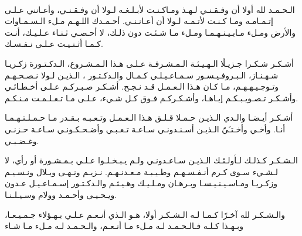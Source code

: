 \ \vfill{}
\begin{center}
    {
        \Large\bfseries
    }
\end{center}

\begin{RLtext}
    الـحـمـد لله أولا أن وفـقـنـي لـهـذ ومـاكـنـت لأبـلـغـه لـولا أن وفـقـنـي،
    وأعـانني عـلـى إتـمـامـه ومـا كـنـت لأتـمـه لـولا أن أعـانـنـي.
    أحـمـدك اللـهـم مـلء الـسـمـاوات والأرض ومـلء مـابـيـنـهـمـا ومـلء مـا شـئـت دون ذلـك،
    لا أحـصـي ثـنـاء عـلـيـك، أنـت كـمـا أثـنـيـت عـلـى نـفـسـك.
    
    أشـكـر شـكـرا جـزيـلًا الـهـيـئـة الـمـشـرفـة عـلـى هـذا الـمـشـروع،
    الـدكـتـورة زكـريـا شـهـنـاز، الـبـروفـيـسـور سـمـاعـيـلـي كـمـال والـدكـتـور ،
    الـذيـن لـولا نـصـحـهـم وتـوجـيـهـهـم، مـا كـان هـذا الـعـمـل قـد نـجـح.
    أشـكـر صـبـركـم عـلـى أخـطـائـي وأشـكـر تـصـويـبـكـم إيـاهـا،
    وأشـكـركـم فـوق كـل شـيء، عـلـى مـا تـعـلـمـت مـنـكـم.
    
    أشـكـر أيـضـا والـدي الـذيـن حـمـلا قـلـق هـذا الـعـمـل وتـعـبـه بـقـدر مـا حـمـلـتـهـمـا أنـا.
    وأخـي وأخـتـَيّ الـذيـن أسـنـدونـي سـاعـة تـعـبـي وأضـحـكـونـي سـاعـة حـزنـي وغـضـبـي.
    
    الـشـكـر كـذلـك لـأولـئـك الـذيـن سـاعـدونـي ولـم يـبـخـلـوا عـلـي بـمـشـورة أو رأي، 
    لا لـشـيء سـوى كـرم أنـفـسـهـم وطـيـبـة مـعـدنـهـم.
    نـزيـم ونـهـى وبـلال ونـسـيـم وزكـريـا ومـاسـيـنـيـسـا وبـرهـان ومـلـيـك وهـيـثـم والـدكـتـور إسـمـاعـيـل عـدون
    ويـحـيـى وأحـمـد وولام وسـيـلـنـا.
    
    والـشـكـر لله آخـرًا كـمـا لـه الـشـكـر أولا، 
    هـو الـذي أنـعـم عـلـي بـهـؤلاء جـمـيـعـا، وبـهـذا كـلـه
    فـالـحـمـد لـه مـلء مـا أنـعـم، والـحـمـد لـه مـلء مـا شـاء
\end{RLtext}
\vfill{}